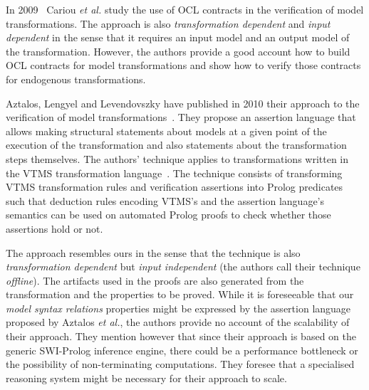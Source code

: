 In 2009~\cite{DBLP:journals/eceasst/CariouBBD09} Cariou \emph{et al.} study the use of OCL contracts in the verification of model transformations. The approach is also \emph{transformation dependent} and \emph{input dependent} in the sense that it requires an input model and an output model of the transformation. However, the authors provide a good account how to build OCL contracts for model transformations and show how to verify those contracts for endogenous transformations.

Aztalos, Lengyel and Levendovszky have published in 2010 their approach to the verification of model transformations~\cite{DBLP:conf/icst/AsztalosLL10}. They propose an assertion language that allows making structural statements about models at a given point of the execution of the transformation and also statements about the transformation steps themselves. The authors' technique applies to transformations written in the VTMS transformation language~\cite{DBLP:journals/entcs/LevendovszkyLMC05}. The technique consists of transforming VTMS transformation rules and verification assertions into Prolog predicates such that deduction rules encoding VTMS's and the assertion language's semantics can be used on automated Prolog proofs to check whether those assertions hold or not.

The approach resembles ours in the sense that the technique is also \emph{transformation dependent} but \emph{input independent} (the authors call their technique \emph{offline}). The artifacts used in the proofs are also generated from the transformation and the properties to be proved. While it is foreseeable that our \emph{model syntax relations} properties might be expressed by the assertion language proposed by Aztalos \emph{et al.}, the authors provide no account of the scalability of their approach. They mention however that since their approach is based on the generic SWI-Prolog inference engine, there could be a performance bottleneck or the possibility of non-terminating computations. They foresee that a specialised reasoning system might be necessary for their approach to scale.

